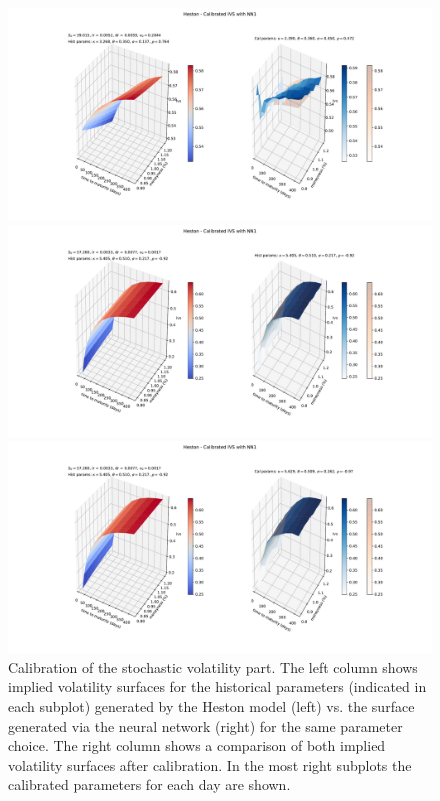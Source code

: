 \documentclass[
a4paper,     %
12pt           %
]{scrartcl}  %
\numberwithin{equation}{section}
\begin{document}
\begin{figure}
\begin{minipage}{0.49\textwidth}
	\end{minipage}
	\begin{minipage}{0.49\textwidth}
		\includegraphics[width=\textwidth]{fig/impvolsurf_calibrated_3}
	\end{minipage}
	\begin{minipage}{0.49\textwidth}
		\includegraphics[width=\textwidth]{fig/impvolsurf_4}
	\end{minipage}
	\begin{minipage}{0.49\textwidth}
		\includegraphics[width=\textwidth]{fig/impvolsurf_calibrated_4}
	\end{minipage}
	\caption{Calibration of the stochastic volatility part. The left column shows implied volatility surfaces for the historical parameters (indicated in each subplot) generated by the Heston model (left) vs. the surface generated via the neural network (right) for the same parameter choice. The right column shows a comparison of both implied volatility surfaces after calibration. In the most right subplots the calibrated parameters for each day are shown.}
	\label{fig:calibration_svpart}
\end{figure}
\end{document}
